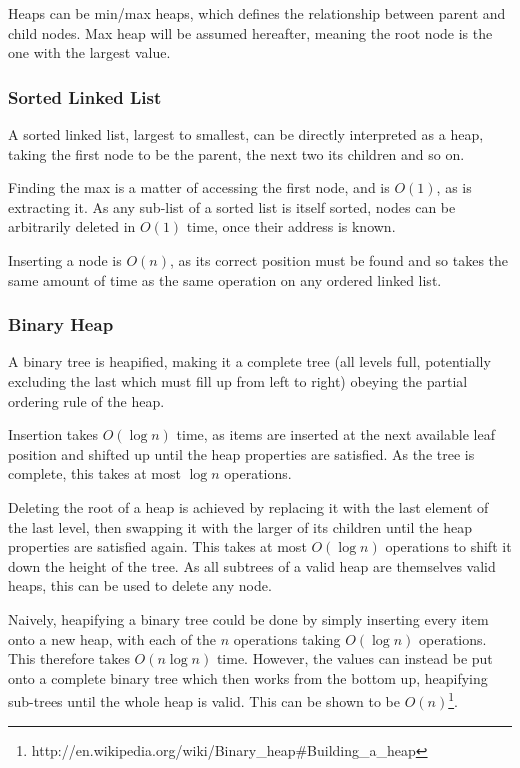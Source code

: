 \documentclass[]{article}
\begin{document}
Heaps can be min/max heaps, which defines the relationship between parent and child nodes. Max heap will be assumed hereafter, meaning the root node is the one with the largest value.

\subsubsection{Sorted Linked List}

A sorted linked list, largest to smallest, can be directly interpreted as a heap, taking the first node to be the parent, the next two its children and so on.

Finding the max is a matter of accessing the first node, and is $O(1)$, as is extracting it. As any sub-list of a sorted list is itself sorted, nodes can be arbitrarily deleted in $O(1)$ time, once their address is known.

Inserting a node is $O(n)$, as its correct position must be found and so takes the same amount of time as the same operation on any ordered linked list.

\subsubsection{Binary Heap}

A binary tree is heapified, making it a complete tree (all levels full, potentially excluding the last which must fill up from left to right) obeying the partial ordering rule of the heap.

Insertion takes $O(\log{n})$ time, as items are inserted at the next available leaf position and shifted up until the heap properties are satisfied. As the tree is complete, this takes at most $\log{n}$ operations.

Deleting the root of a heap is achieved by replacing it with the last element of the last level, then swapping it with the larger of its children until the heap properties are satisfied again. This takes at most $O(\log{n})$ operations to shift it down the height of the tree. As all subtrees of a valid heap are themselves valid heaps, this can be used to delete any node.

Naively, heapifying a binary tree could be done by simply inserting every item onto a new heap, with each of the $n$ operations taking $O(\log{n})$ operations. This therefore takes $O(n\log{n})$ time. However, the values can instead be put onto a complete binary tree which then works from the bottom up, heapifying sub-trees until the whole heap is valid. This can be shown to be $O(n)$\footnote{http://en.wikipedia.org/wiki/Binary\_heap\#Building\_a\_heap}.
\end{document}
